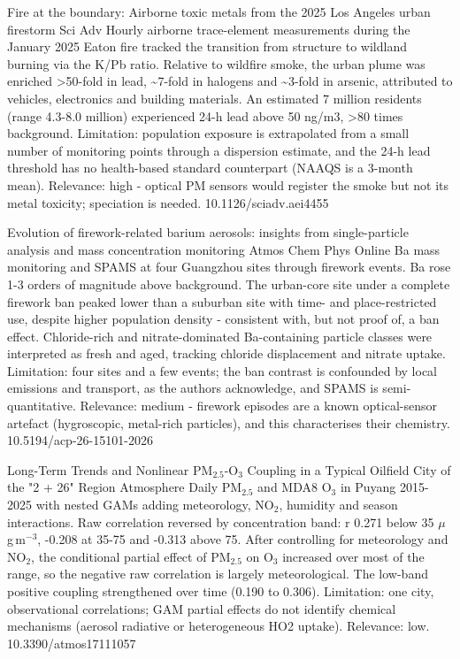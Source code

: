 \documentclass[10pt]{article}
\begin{document}
\par{}\baselineskip{}\baselineskip
{}

{Fire at the boundary: Airborne toxic metals from the 2025 Los Angeles urban firestorm}
{Sci Adv}
{Hourly airborne trace-element measurements during the January 2025 Eaton fire tracked the transition from structure to wildland burning via the K/Pb ratio. Relative to wildfire smoke, the urban plume was enriched >50-fold in lead, \textasciitilde{}7-fold in halogens and \textasciitilde{}3-fold in arsenic, attributed to vehicles, electronics and building materials. An estimated 7 million residents (range 4.3-8.0 million) experienced 24-h lead above 50 ng/m3, >80 times background. Limitation: population exposure is extrapolated from a small number of monitoring points through a dispersion estimate, and the 24-h lead threshold has no health-based standard counterpart (NAAQS is a 3-month mean). Relevance: high - optical PM sensors would register the smoke but not its metal toxicity; speciation is needed.}
{10.1126/sciadv.aei4455}

{Evolution of firework-related barium aerosols: insights from single-particle analysis and mass concentration monitoring}
{Atmos Chem Phys}
{Online Ba mass monitoring and SPAMS at four Guangzhou sites through firework events. Ba rose 1-3 orders of magnitude above background. The urban-core site under a complete firework ban peaked lower than a suburban site with time- and place-restricted use, despite higher population density - consistent with, but not proof of, a ban effect. Chloride-rich and nitrate-dominated Ba-containing particle classes were interpreted as fresh and aged, tracking chloride displacement and nitrate uptake. Limitation: four sites and a few events; the ban contrast is confounded by local emissions and transport, as the authors acknowledge, and SPAMS is semi-quantitative. Relevance: medium - firework episodes are a known optical-sensor artefact (hygroscopic, metal-rich particles), and this characterises their chemistry.}
{10.5194/acp-26-15101-2026}

{Long-Term Trends and Nonlinear PM$_{2.5}$-O$_3$ Coupling in a Typical Oilfield City of the "2 + 26" Region}
{Atmosphere}
{Daily PM$_{2.5}$ and MDA8 O$_3$ in Puyang 2015-2025 with nested GAMs adding meteorology, NO$_2$, humidity and season interactions. Raw correlation reversed by concentration band: r 0.271 below 35 $\mu$g\,m$^{-3}$, -0.208 at 35-75 and -0.313 above 75. After controlling for meteorology and NO$_2$, the conditional partial effect of PM$_{2.5}$ on O$_3$ increased over most of the range, so the negative raw correlation is largely meteorological. The low-band positive coupling strengthened over time (0.190 to 0.306). Limitation: one city, observational correlations; GAM partial effects do not identify chemical mechanisms (aerosol radiative or heterogeneous HO2 uptake). Relevance: low.}
{10.3390/atmos17111057}
\end{document}
